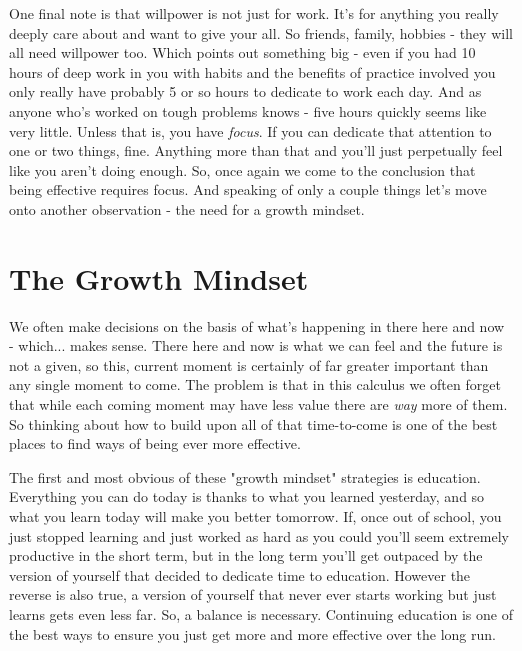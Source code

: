 \documentclass[11pt,a5paper]{book}
\begin{document}
One final note is that willpower is not just for work. It's for anything you really deeply care about and want to give your all. So friends, family, hobbies - they will all need willpower too. Which points out something big - even if you had 10 hours of deep work in you with habits and the benefits of practice involved you only really have probably 5 or so hours to dedicate to work each day. And as anyone who's worked on tough problems knows - five hours quickly seems like very little. Unless that is, you have \textit{focus}. If you can dedicate that attention to one or two things, fine. Anything more than that and you'll just perpetually feel like you aren't doing enough. So, once again we come to the conclusion that being effective requires focus. And speaking of only a couple things let's move onto another observation - the need for a growth mindset.

\section{The Growth Mindset}
We often make decisions on the basis of what's happening in there here and now - which... makes sense. There here and now is what we can feel and the future is not a given, so this, current moment is certainly of far greater important than any single moment to come. The problem is that in this calculus we often forget that while each coming moment may have less value there are \textit{way} more of them. So thinking about how to build upon all of that time-to-come is one of the best places to find ways of being ever more effective.
\newline

The first and most obvious of these "growth mindset" strategies is education. Everything you can do today is thanks to what you learned yesterday, and so what you learn today will make you better tomorrow. If, once out of school, you just stopped learning and just worked as hard as you could you'll seem extremely productive in the short term, but in the long term you'll get outpaced by the version of yourself that decided to dedicate time to education. However the reverse is also true, a version of yourself that never ever starts working but just learns gets even less far. So, a balance is necessary. Continuing education is one of the best ways to ensure you just get more and more effective over the long run. 
\newline
\end{document}
